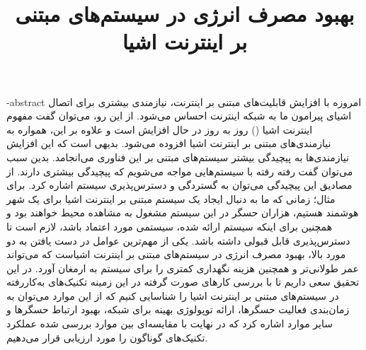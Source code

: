 \documentclass[oneside,openany,mscS]{SBU-Thesis}
\begin{document}
	\title{بهبود مصرف انرژی در سیستم‌های مبتنی بر اینترنت اشیا}
	
	\subject{مهندسی کامپیوتر}
	
	
	


	
	

	\fa-abstract{
امروزه با افزایش قابلیت‌های مبتنی بر اینترنت، نیازمندی بیشتری برای اتصال اشیای پیرامون ما به شبکه اینترنت احساس می‌شود. از این رو، می‌توان گفت مفهوم اینترنت اشیا () روز به روز در حال افزایش است و علاوه بر این، همواره به نیازمندی‌های مبتنی بر اینترنت اشیا افزوده می‌شود. بدیهی است که این افزایش نیازمندی‌ها به پیچیدگی بیشتر سیستم‌های مبتنی بر این فناوری می‌انجامد. بدین سبب می‌توان گفت رفته رفته با سیستم‌هایی مواجه می‌شویم که پیچیدگی بیشتری دارند. از مصادیق این پیچیدگی می‌توان به گستردگی و دسترس‌پذیری سیستم اشاره کرد. برای مثال؛ زمانی که ما به دنبال ایجاد یک سیستم مبتنی بر اینترنت اشیا برای یک شهر هوشمند هستیم، هزاران حسگر در این سیستم مشغول به مشاهده محیط خواهند بود و همچنین برای اینکه سیستم ارائه شده، سیستمی مورد اعتماد باشد، لازم است تا دسترس‌پذیری قابل قبولی داشته باشد. یکی از مهم‌ترین عوامل در دست یافتن به دو مورد بالا، بهبود مصرف انرژی در سیستم‌های مبتنی بر اینترنت اشیاست که می‌تواند عمر طولانی‌تر و همچنین هزینه نگهداری کمتری را برای سیستم به ارمغان آورد. در این تحقیق سعی داریم تا با بررسی کارهای صورت گرفته در این زمینه تکنیک‌های به‌کاررفته در سیستم‌های مبتنی بر اینترنت اشیا را شناسایی کنیم که از این موارد می‌توان به زمان‌بندی فعالیت حسگرها، ارائه توپولوژی بهینه برای شبکه، بهبود ارتباط حسگرها و سایر موارد اشاره کرد که در نهایت با مقایسه‌ای بین موارد بررسی شده عملکرد تکنیک‌های گوناگون را مورد ارزیابی قرار می‌دهیم. 
	}

\firstPage
\abstractPage %


\tableofcontents %
\listoffigures \newpage %






	
\newpage

\end{document}
